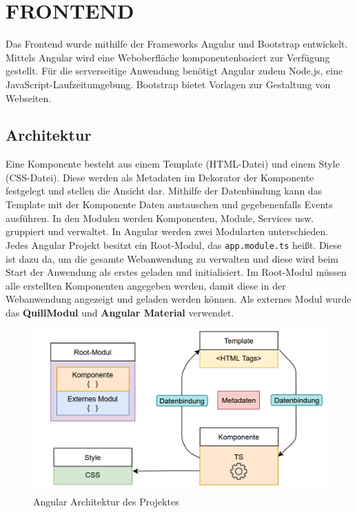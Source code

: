 \section{FRONTEND}\label{ch:frontend}

Das Frontend wurde mithilfe der Frameworks Angular und Bootstrap entwickelt.
Mittels Angular wird eine Weboberfläche komponentenbasiert zur Verfügung gestellt.
Für die serverseitige Anwendung benötigt Angular zudem Node.js, eine JavaScript-Laufzeitumgebung.
Bootstrap bietet Vorlagen zur Gestaltung von Webseiten.

\subsection{Architektur}
Eine Komponente besteht aus einem Template (HTML-Datei) und einem Style (CSS-Datei). Diese werden als Metadaten im Dekorator der Komponente festgelegt und stellen die Ansicht dar.
Mithilfe der Datenbindung kann das Template mit der Komponente Daten austauschen und gegebenenfalls Events ausführen. In den Modulen werden Komponenten, Module, Services usw. gruppiert und verwaltet. In Angular werden zwei Modularten unterschieden. Jedes Angular Projekt besitzt ein Root-Modul, das \texttt{app.module.ts} heißt. Diese ist dazu da, um die gesamte Webanwendung zu verwalten und diese wird beim Start der Anwendung als erstes geladen und initialisiert. Im Root-Modul müssen alle erstellten Komponenten angegeben werden, damit diese in der Webanwendung angezeigt und geladen werden können. Als externes Modul wurde das \textbf{QuillModul} und \textbf{Angular Material} verwendet.

\begin{figure}[thpb]
      \centering
      \includegraphics[scale=0.55]{abbildungen/angular_architektur.png}
      \caption{Angular Architektur des Projektes}
      \label{fig:frontend}
 \end{figure}

